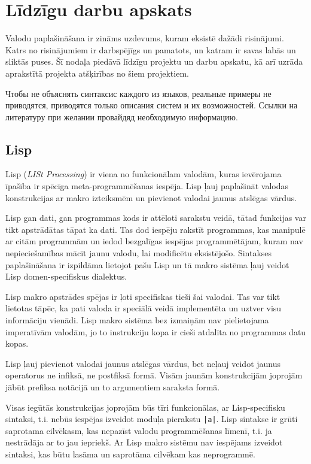 \section{\label{s:related}Līdzīgu darbu apskats}

Valodu paplašināšana ir zināms uzdevums, kuram eksistē dažādi risinājumi. Katrs no risinājumiem ir darbspējīgs un pamatots, un katram ir savas labās un sliktās puses. Šī nodaļa piedāvā līdzīgu projektu un darbu apskatu, kā arī uzrāda aprakstītā projekta atšķirības no šiem projektiem.

Чтобы не объяснять синтаксис каждого из языков, реальные примеры не приводятся, приводятся только описания систем и их возможностей. Ссылки на литературу при желании провайдяд необходимую информацию.

\subsection{Lisp}

Lisp (\emph{LISt Processing}) ir viena no funkcionālam valodām, kuras ievērojama īpašība ir spēcīga meta-programmēšanas iespēja. Lisp ļauj paplašināt valodas konstrukcijas ar makro izteiksmēm un pievienot valodai jaunus atslēgas vārdus.

Lisp gan dati, gan programmas kods ir attēloti sarakstu veidā, tātad funkcijas var tikt apstrādātas tāpat ka dati. Tas dod iespēju rakstīt programmas, kas manipulē ar citām programmām un iedod bezgalīgas iespējas programmētājam, kuram nav nepieciešamības mācīt jaunu valodu, lai modificētu eksistējošo. Sintakses paplašināšana ir izpildāma lietojot pašu Lisp un tā makro sistēma ļauj veidot Lisp domen-specifiskus dialektus.

Lisp makro apstrādes spējas ir ļoti specifiskas tieši šai valodai. Tas var tikt lietotas tāpēc, ka pati valoda ir speciālā veidā implementēta un uztver visu informāciju vienādi. Lisp makro sistēma bez izmaiņām nav pielietojama imperatīvām valodām, jo to instrukciju kopa ir cieši atdalīta no programmas datu kopas.

Lisp ļauj pievienot valodai jaunus atslēgas vārdus, bet neļauj veidot jaunus operatorus ne infiksā, ne postfiksā formā. Visām jaunām konstrukcijām joprojām jābūt prefiksa notācijā un to argumentiem saraksta formā.

Visas iegūtās konstrukcijas joprojām būs tīri funkcionālas, ar Lisp-specifisku sintaksi, t.i. nebūs iespējas izveidot moduļa pierakstu \verb/|a|/. Lisp sintakse ir grūti saprotama cilvēkasm, kas nepazīst valodu programmēšanas līmenī, t.i. ja nestrādāja ar to jau iepriekš. Ar Lisp makro sistēmu nav iespējams izveidot sintaksi, kas būtu lasāma un saprotāma cilvēkam kas neprogrammē.

